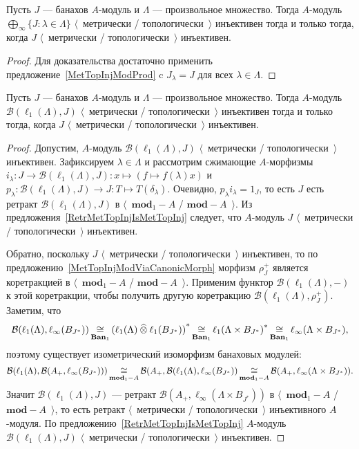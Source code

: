 \begin{corollary}\label{MetTopInjlInftySum} Пусть $J$ --- банахов $A$-модуль и
$\Lambda$ --- произвольное множество. Тогда $A$-модуль  $\bigoplus_\infty
\{J:\lambda\in\Lambda \}$ $\langle$~метрически / топологически~$\rangle$
инъективен тогда и только тогда, когда $J$ $\langle$~метрически /
топологически~$\rangle$ инъективен.
\end{corollary}
\begin{proof} Для доказательства достаточно применить
предложение~\ref{MetTopInjModProd} c $J_\lambda=J$ для всех $\lambda\in\Lambda$.
\end{proof}

\begin{proposition}\label{MapsFroml1toMetTopInj} Пусть $J$ --- банахов
$A$-модуль и $\Lambda$ --- произвольное множество. Тогда $A$-модуль
$\mathcal{B}(\ell_1(\Lambda),J)$ $\langle$~метрически / топологически~$\rangle$
инъективен тогда и только тогда, когда $J$ $\langle$~метрически /
топологически~$\rangle$ инъективен.
\end{proposition}
\begin{proof} 
Допустим, $A$-модуль $\mathcal{B}(\ell_1(\Lambda), J)$  $\langle$~метрически /
топологически~$\rangle$ инъективен. Зафиксируем $\lambda\in\Lambda$ и рассмотрим
сжимающие $A$-морфизмы
$i_\lambda:J\to\mathcal{B}(\ell_1(\Lambda),J):x\mapsto(f\mapsto f(\lambda)x)$ и
$p_\lambda:\mathcal{B}(\ell_1(\Lambda),J)\to J:T\mapsto T(\delta_\lambda)$.
Очевидно, $p_\lambda i_\lambda=1_J$, то есть $J$ есть ретракт
$\mathcal{B}(\ell_1(\Lambda),J)$ в $\langle$~$\mathbf{mod}_1-A$ /
$\mathbf{mod}-A$~$\rangle$. Из предложения~\ref{RetrMetTopInjIsMetTopInj}
следует, что $A$-модуль $J$ $\langle$~метрически / топологически~$\rangle$
инъективен.

Обратно, поскольку $J$ $\langle$~метрически / топологически~$\rangle$
инъективен, то по предложению~\ref{MetTopInjModViaCanonicMorph} морфизм
$\rho_J^+$ является коретракцией в $\langle$~$\mathbf{mod}_1-A$ /
$\mathbf{mod}-A$~$\rangle$. Применим функтор $\mathcal{B}(\ell_1(\Lambda),-)$ к
этой коретракции, чтобы получить другую коретракцию
$\mathcal{B}(\ell_1(\Lambda),\rho_J^+)$. Заметим, что 
$$
\mathcal{B}(\ell_1(\Lambda),\ell_\infty(B_{J^*}))
\mathop{\mathbin{\cong}}\limits_{\mathbf{Ban}_1}{(\ell_1(\Lambda)\mathbin{\widehat{\otimes}} \ell_1(B_{J^*}))}^*
\mathop{\mathbin{\cong}}\limits_{\mathbf{Ban}_1}{\ell_1(\Lambda\times B_{J^*})}^*
\mathop{\mathbin{\cong}}\limits_{\mathbf{Ban}_1}\ell_\infty(\Lambda\times B_{J^*}),
$$ 
поэтому существует изометрический изоморфизм банаховых модулей:
$$
\mathcal{B}(\ell_1(\Lambda),\mathcal{B}(A_+,\ell_\infty(B_{J^*})))
\mathop{\mathbin{\cong}}\limits_{\mathbf{mod}_1-A}\mathcal{B}(
    A_+,\mathcal{B}(\ell_1(\Lambda),\ell_\infty(B_{J^*})
)
\mathop{\mathbin{\cong}}\limits_{\mathbf{mod}_1-A}\mathcal{B}(A_+,\ell_\infty(\Lambda\times B_{J^*})).
$$ 
Значит $\mathcal{B}(\ell_1(\Lambda),J)$ --- ретракт
$\mathcal{B}(A_+,\ell_\infty(\Lambda\times B_{J^*}))$ в
$\langle$~$\mathbf{mod}_1-A$ / $\mathbf{mod}-A$~$\rangle$, то есть ретракт
$\langle$~метрически / топологически~$\rangle$ инъективного $A$-модуля. По
предложению~\ref{RetrMetTopInjIsMetTopInj} $A$-модуль
$\mathcal{B}(\ell_1(\Lambda), J)$ $\langle$~метрически / топологически~$\rangle$
инъективен.
\end{proof}

